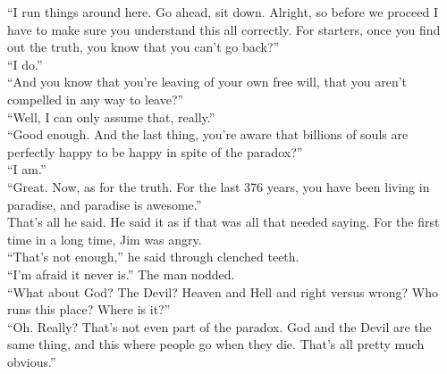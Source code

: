 \enquote{I run things around here.  Go ahead, sit down.  Alright, so before we proceed I have to make sure you understand this all correctly.  For starters, once you find out the truth, you know that you can't go back?}\\



\enquote{I do.}\\



\enquote{And you know that you're leaving of your own free will, that you aren't compelled in any way to leave?}\\



\enquote{Well, I can only assume that, really.}\\



\enquote{Good enough.  And the last thing, you're aware that billions of souls are perfectly happy to be happy in spite of the paradox?}\\



\enquote{I am.}\\



\enquote{Great.  Now, as for the truth.  For the last 376 years, you have been living in paradise, and paradise is awesome.}\\



That's all he said.  He said it as if that was all that needed saying.  For the first time in a long time, Jim was angry.\\



\enquote{That's not enough,} he said through clenched teeth.  \\



\enquote{I'm afraid it never is.}  The man nodded.\\



\enquote{What about God?  The Devil?  Heaven and Hell and right versus wrong?  Who runs this place?  Where is it?}\\



\enquote{Oh.  Really?  That's not even part of the paradox.  God and the Devil are the same thing, and this where people go when they die.  That's all pretty much obvious.}\\



